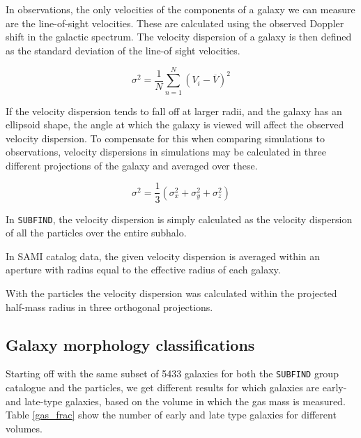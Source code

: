 In observations, the only velocities of the components of a galaxy we can measure are the line-of-sight velocities. These are calculated using the observed Doppler shift in the galactic spectrum. The velocity dispersion of a galaxy is then defined as the standard deviation of the line-of sight velocities.

\begin{equation} \label{standard_dev}
    \sigma^{2} = \frac{1}{N} \sum_{n=1}^{N} (V_{i} - \overline{V})^2
\end{equation}

If the velocity dispersion tends to fall off at larger radii, and the galaxy has an ellipsoid shape, the angle at which the galaxy is viewed will affect the observed velocity dispersion. To compensate for this when comparing simulations to observations, velocity dispersions in simulations may be calculated in three different projections of the galaxy and averaged over these. 

\begin{equation} \label{sigma1}
    \sigma^{2} = \frac{1}{3}(\sigma_x^2 + \sigma_y^2 + \sigma_z^2)
\end{equation}



In \texttt{SUBFIND}, the velocity dispersion is simply calculated as the velocity dispersion of all the particles over the entire subhalo.

In SAMI catalog data, the given velocity dispersion is averaged within an aperture with radius equal to the effective radius of each galaxy.

With the particles the velocity dispersion was calculated within the projected half-mass radius in three orthogonal projections.


\subsection{Galaxy morphology classifications}

Starting off with the same subset of 5433 galaxies for both the \texttt{SUBFIND} group catalogue and the particles, we get different results for which galaxies are early- and late-type galaxies, based on the volume in which the gas mass is measured. Table \ref{gas_frac} show the number of early and late type galaxies for different volumes.



